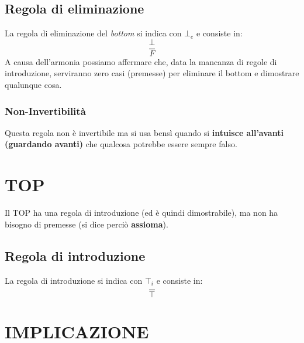 \documentclass[12pt]{article}
\begin{document}
\subsection{Regola di eliminazione}
La regola di eliminazione del \textit{bottom} si indica con $\bot_e$ e consiste in:
\begin{equation}
    \dfrac{\bot}{F} \label{rule:bot_elim}
\end{equation}
A causa dell'armonia possiamo affermare che, data la mancanza di regole di introduzione, serviranno zero casi (premesse) per eliminare il bottom e dimostrare qualunque cosa.
\subsubsection{Non-Invertibilità}
Questa regola non è invertibile ma si usa bensì quando si \textbf{intuisce all'avanti (guardando avanti)} che qualcosa potrebbe essere sempre falso.
\section{TOP}
Il TOP ha una regola di introduzione (ed è quindi dimostrabile), ma non ha bisogno di premesse (si dice perciò \textbf{assioma}).
\subsection{Regola di introduzione}
La regola di introduzione si indica con $\top_i$ e consiste in:
\begin{equation}
    \dfrac{}{\top}  \label{rule:top_intro}
\end{equation}
\pagebreak
\section{IMPLICAZIONE}
\end{document}
